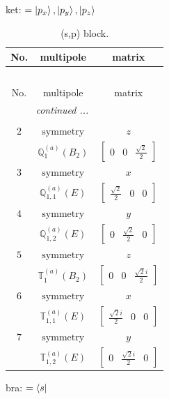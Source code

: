 \documentclass[fleqn,8pt,landscape]{jsarticle}
\begin{document}
\noindent
ket: $=\ket{p_{x}}, \ket{p_{y}}, \ket{p_{z}}$
\renewcommand{\arraystretch}{1.6}
\begin{longtable}{ccc}
\caption{(s,p) block.}
 \\
 \hline \hline
No. & multipole & matrix \\ \hline \endfirsthead

\multicolumn{2}{l}{\tablename\ \thetable{}} \\
 \hline \hline
No. & multipole & matrix \\ \hline \endhead

 \hline \hline
\multicolumn{2}{r}{\footnotesize\it continued ...} \\ \endfoot

 \hline \hline
\multicolumn{2}{r}{} \\ \endlastfoot

$ 2 $ & $ \text{symmetry} $ & $ z $ \\
$  $ & $ \mathbb{Q}_{1}^{(a)}(B_{2}) $ & $ \begin{bmatrix} 0 & 0 & \frac{\sqrt{2}}{2} \end{bmatrix} $ \\ \hline
$ 3 $ & $ \text{symmetry} $ & $ x $ \\
$  $ & $ \mathbb{Q}_{1,1}^{(a)}(E) $ & $ \begin{bmatrix} \frac{\sqrt{2}}{2} & 0 & 0 \end{bmatrix} $ \\ \hline
$ 4 $ & $ \text{symmetry} $ & $ y $ \\
$  $ & $ \mathbb{Q}_{1,2}^{(a)}(E) $ & $ \begin{bmatrix} 0 & \frac{\sqrt{2}}{2} & 0 \end{bmatrix} $ \\ \hline
$ 5 $ & $ \text{symmetry} $ & $ z $ \\
$  $ & $ \mathbb{T}_{1}^{(a)}(B_{2}) $ & $ \begin{bmatrix} 0 & 0 & \frac{\sqrt{2} i}{2} \end{bmatrix} $ \\ \hline
$ 6 $ & $ \text{symmetry} $ & $ x $ \\
$  $ & $ \mathbb{T}_{1,1}^{(a)}(E) $ & $ \begin{bmatrix} \frac{\sqrt{2} i}{2} & 0 & 0 \end{bmatrix} $ \\ \hline
$ 7 $ & $ \text{symmetry} $ & $ y $ \\
$  $ & $ \mathbb{T}_{1,2}^{(a)}(E) $ & $ \begin{bmatrix} 0 & \frac{\sqrt{2} i}{2} & 0 \end{bmatrix} $ \\ \hline
\end{longtable}
bra: $=\bra{s}$
\end{document}
